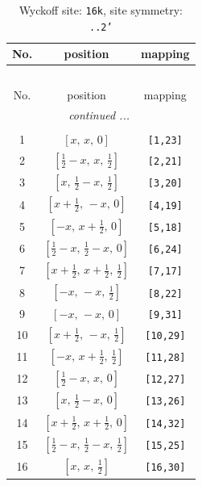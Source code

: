 \documentclass[fleqn,8pt]{jsarticle}
\begin{document}
\begin{longtable}{ccc}
\caption{Wyckoff site: {\tt 16k}, site symmetry: {\tt ..2'}}
 \\
 \hline \hline
No. & position & mapping \\ \hline \endfirsthead

\multicolumn{2}{l}{\tablename\ \thetable{}} \\
 \hline \hline
No. & position & mapping \\ \hline \endhead

 \hline \hline
\multicolumn{2}{r}{\footnotesize\it continued ...} \\ \endfoot

 \hline \hline
\multicolumn{2}{r}{} \\ \endlastfoot

1 & $\left[ x,\, x,\, 0 \right]$ & {\tt [1,23]} \\ \hline
2 & $\left[ \frac{1}{2} - x,\, x,\, \frac{1}{2} \right]$ & {\tt [2,21]} \\ \hline
3 & $\left[ x,\, \frac{1}{2} - x,\, \frac{1}{2} \right]$ & {\tt [3,20]} \\ \hline
4 & $\left[ x + \frac{1}{2},\, - x,\, 0 \right]$ & {\tt [4,19]} \\ \hline
5 & $\left[ - x,\, x + \frac{1}{2},\, 0 \right]$ & {\tt [5,18]} \\ \hline
6 & $\left[ \frac{1}{2} - x,\, \frac{1}{2} - x,\, 0 \right]$ & {\tt [6,24]} \\ \hline
7 & $\left[ x + \frac{1}{2},\, x + \frac{1}{2},\, \frac{1}{2} \right]$ & {\tt [7,17]} \\ \hline
8 & $\left[ - x,\, - x,\, \frac{1}{2} \right]$ & {\tt [8,22]} \\ \hline
9 & $\left[ - x,\, - x,\, 0 \right]$ & {\tt [9,31]} \\ \hline
10 & $\left[ x + \frac{1}{2},\, - x,\, \frac{1}{2} \right]$ & {\tt [10,29]} \\ \hline
11 & $\left[ - x,\, x + \frac{1}{2},\, \frac{1}{2} \right]$ & {\tt [11,28]} \\ \hline
12 & $\left[ \frac{1}{2} - x,\, x,\, 0 \right]$ & {\tt [12,27]} \\ \hline
13 & $\left[ x,\, \frac{1}{2} - x,\, 0 \right]$ & {\tt [13,26]} \\ \hline
14 & $\left[ x + \frac{1}{2},\, x + \frac{1}{2},\, 0 \right]$ & {\tt [14,32]} \\ \hline
15 & $\left[ \frac{1}{2} - x,\, \frac{1}{2} - x,\, \frac{1}{2} \right]$ & {\tt [15,25]} \\ \hline
16 & $\left[ x,\, x,\, \frac{1}{2} \right]$ & {\tt [16,30]} \\
\end{longtable}
\end{document}
